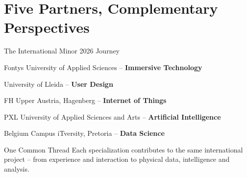\part[nopartpage]{Five Partners, Complementary Perspectives}

\begin{frame}{The International Minor 2026 Journey}
\begin{description}
    \item[Netherlands] Fontys University of Applied Sciences -- \textbf{Immersive Technology}
    \item[Spain] University of Lleida -- \textbf{User Design}
    \item[Austria] FH Upper Austria, Hagenberg -- \textbf{Internet of Things}
    \item[Belgium] PXL University of Applied Sciences and Arts -- \textbf{Artificial Intelligence}
    \item[South Africa] Belgium Campus iTversity, Pretoria -- \textbf{Data Science}
\end{description}
\begin{alertblock}{One Common Thread}
Each specialization contributes to the same international project -- from experience and interaction to physical data, intelligence and analysis.
\end{alertblock}
\end{frame}
